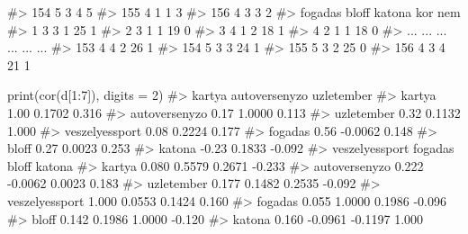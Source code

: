 \documentclass[
  letterpaper,
]{krantz}
\makeatletter
\newenvironment{Shaded}{\begin{snugshade}}{\end{snugshade}}
\newcommand{\AttributeTok}[1]{\textcolor[rgb]{0.40,0.45,0.13}{#1}}
\newcommand{\CommentTok}[1]{\textcolor[rgb]{0.37,0.37,0.37}{#1}}
\newcommand{\DecValTok}[1]{\textcolor[rgb]{0.68,0.00,0.00}{#1}}
\newcommand{\FunctionTok}[1]{\textcolor[rgb]{0.28,0.35,0.67}{#1}}
\newcommand{\NormalTok}[1]{\textcolor[rgb]{0.00,0.23,0.31}{#1}}
\newcommand{\SpecialCharTok}[1]{\textcolor[rgb]{0.37,0.37,0.37}{#1}}
\newenvironment{kframe}{%
\medskip{}
\setlength{\fboxsep}{.8em}
 \def\at@end@of@kframe{}%
 \ifinner\ifhmode%
  \def\at@end@of@kframe{\end{minipage}}%
  \begin{minipage}{\columnwidth}%
 \fi\fi%
 \def\FrameCommand##1{\hskip\@totalleftmargin \hskip-\fboxsep
 \colorbox{shadecolor}{##1}\hskip-\fboxsep
     \hskip-\linewidth \hskip-\@totalleftmargin \hskip\columnwidth}%
 \MakeFramed {\advance\hsize-\width
   \@totalleftmargin\z@ \linewidth\hsize
   \@setminipage}}%
 {\par\unskip\endMakeFramed%
 \at@end@of@kframe}
\renewenvironment{Shaded}{\begin{kframe}}{\end{kframe}}
\makeatother
\begin{document}
\begin{Shaded}
\begin{Highlighting}[]
\CommentTok{\#\textgreater{} 154      5             3          4              5}
\CommentTok{\#\textgreater{} 155      4             1          1              3}
\CommentTok{\#\textgreater{} 156      4             3          3              2}
\CommentTok{\#\textgreater{}     fogadas bloff katona kor nem}
\CommentTok{\#\textgreater{} 1         3     3      1  25   1}
\CommentTok{\#\textgreater{} 2         3     1      1  19   0}
\CommentTok{\#\textgreater{} 3         4     1      2  18   1}
\CommentTok{\#\textgreater{} 4         2     1      1  18   0}
\CommentTok{\#\textgreater{} ...     ...   ...    ... ... ...}
\CommentTok{\#\textgreater{} 153       4     4      2  26   1}
\CommentTok{\#\textgreater{} 154       5     3      3  24   1}
\CommentTok{\#\textgreater{} 155       5     3      2  25   0}
\CommentTok{\#\textgreater{} 156       4     3      4  21   1}
\end{Highlighting}
\end{Shaded}

\begin{Shaded}
\begin{Highlighting}[]
\FunctionTok{print}\NormalTok{(}\FunctionTok{cor}\NormalTok{(d[}\DecValTok{1}\SpecialCharTok{:}\DecValTok{7}\NormalTok{]), }\AttributeTok{digits =} \DecValTok{2}\NormalTok{)}
\CommentTok{\#\textgreater{}                kartya autoversenyzo uzletember}
\CommentTok{\#\textgreater{} kartya           1.00        0.1702      0.316}
\CommentTok{\#\textgreater{} autoversenyzo    0.17        1.0000      0.113}
\CommentTok{\#\textgreater{} uzletember       0.32        0.1132      1.000}
\CommentTok{\#\textgreater{} veszelyessport   0.08        0.2224      0.177}
\CommentTok{\#\textgreater{} fogadas          0.56       {-}0.0062      0.148}
\CommentTok{\#\textgreater{} bloff            0.27        0.0023      0.253}
\CommentTok{\#\textgreater{} katona          {-}0.23        0.1833     {-}0.092}
\CommentTok{\#\textgreater{}                veszelyessport fogadas   bloff katona}
\CommentTok{\#\textgreater{} kartya                  0.080  0.5579  0.2671 {-}0.233}
\CommentTok{\#\textgreater{} autoversenyzo           0.222 {-}0.0062  0.0023  0.183}
\CommentTok{\#\textgreater{} uzletember              0.177  0.1482  0.2535 {-}0.092}
\CommentTok{\#\textgreater{} veszelyessport          1.000  0.0553  0.1424  0.160}
\CommentTok{\#\textgreater{} fogadas                 0.055  1.0000  0.1986 {-}0.096}
\CommentTok{\#\textgreater{} bloff                   0.142  0.1986  1.0000 {-}0.120}
\CommentTok{\#\textgreater{} katona                  0.160 {-}0.0961 {-}0.1197  1.000}
\end{Highlighting}
\end{Shaded}
\end{document}
